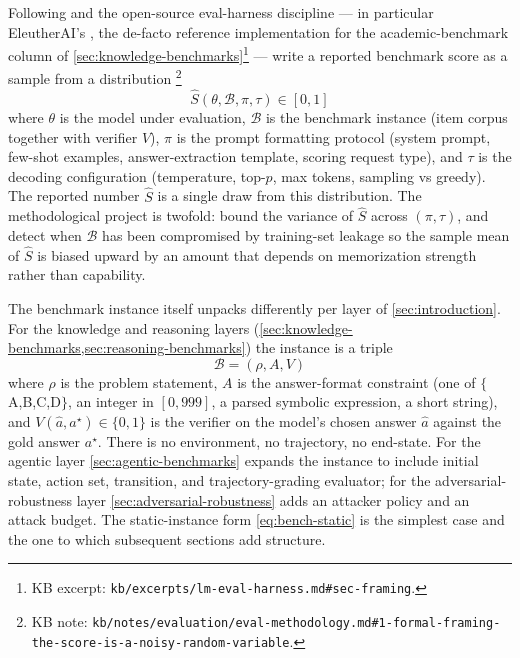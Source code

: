 Following \citet{liang2022-helm} and the open-source eval-harness
discipline --- in particular EleutherAI's
\texttt{} \citep{lm-eval-harness}, the
de-facto reference implementation for the academic-benchmark
column of \cref{sec:knowledge-benchmarks}\footnote{KB excerpt:
\texttt{kb/excerpts/lm-eval-harness.md\#sec-framing}.} ---
write a reported benchmark score as a sample from a distribution%
\footnote{KB note: \texttt{kb/notes/evaluation/eval-methodology.md\#1-formal-framing-the-score-is-a-noisy-random-variable}.}
\begin{equation}
\hat{S}(\theta, \mathcal{B}, \pi, \tau) \in [0, 1]
\label{eq:score-rv}
\end{equation}
where $\theta$ is the model under evaluation, $\mathcal{B}$ is the
benchmark instance (item corpus together with verifier $V$), $\pi$ is
the prompt formatting protocol (system prompt, few-shot examples,
answer-extraction template, scoring request type), and $\tau$ is the
decoding configuration (temperature, top-$p$, max tokens, sampling vs
greedy). The reported number $\hat{S}$ is a single draw from this
distribution. The methodological project is twofold: bound the
variance of $\hat{S}$ across $(\pi, \tau)$, and detect when
$\mathcal{B}$ has been compromised by training-set leakage so the
sample mean of $\hat{S}$ is biased upward by an amount that depends
on memorization strength rather than capability.

The benchmark instance itself unpacks differently per layer of
\cref{sec:introduction}. For the knowledge and reasoning layers
(\cref{sec:knowledge-benchmarks,sec:reasoning-benchmarks}) the
instance is a triple
\begin{equation}
\mathcal{B} = (\rho, A, V)
\label{eq:bench-static}
\end{equation}
where $\rho$ is the problem statement, $A$ is the answer-format
constraint (one of $\{$A,B,C,D$\}$, an integer in $[0, 999]$, a
parsed symbolic expression, a short string), and
$V(\hat{a}, a^\star) \in \{0, 1\}$ is the verifier on the model's
chosen answer $\hat{a}$ against the gold answer $a^\star$. There is
no environment, no trajectory, no end-state. For the agentic layer
\cref{sec:agentic-benchmarks} expands the instance to include initial
state, action set, transition, and trajectory-grading evaluator; for
the adversarial-robustness layer \cref{sec:adversarial-robustness}
adds an attacker policy and an attack budget. The static-instance
form \eqref{eq:bench-static} is the simplest case and the one to
which subsequent sections add structure.

